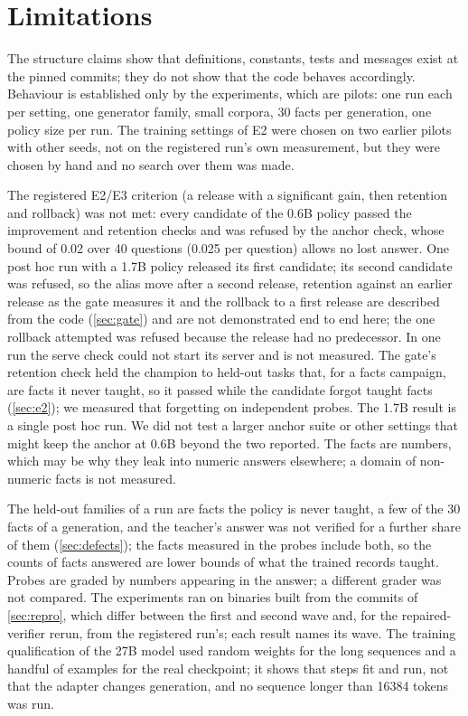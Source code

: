 
\section{Limitations}\label{sec:limitations}

The structure claims show that definitions, constants, tests and messages exist at the pinned
commits; they do not show that the code behaves accordingly. Behaviour is established only by
the experiments, which are pilots: one run each per setting, one generator family, small
corpora, 30 facts per generation, one policy size per run. The training settings of E2 were
chosen on two earlier pilots with other seeds, not on the registered run's own measurement, but
they were chosen by hand and no search over them was made.

The registered E2/E3 criterion (a release with a significant gain, then retention and rollback) was not
met: every candidate of the 0.6B policy passed the improvement and retention checks and was refused by the
anchor check, whose bound of 0.02 over 40 questions (0.025 per question) allows no lost answer. One
post hoc run with a 1.7B policy released its first candidate; its second candidate was refused, so the
alias move after a second release, retention against an earlier release as the gate measures it and the rollback
to a first release are described from the code (\cref{sec:gate}) and are not demonstrated end to end here;
the one rollback attempted was refused because the release had no predecessor. In one run the serve check
could not start its server and is not measured. The gate's retention check held the champion to held-out tasks that,
for a facts campaign, are facts it never taught, so it passed while the candidate forgot taught facts
(\cref{sec:e2}); we measured that forgetting on independent probes. The 1.7B result is a single post hoc run.
We did not test a larger anchor suite or other settings that might keep the anchor at 0.6B beyond the two
reported. The facts are numbers, which may be why they leak into numeric answers elsewhere; a
domain of non-numeric facts is not measured.

The held-out families of a run are facts the policy is never taught, a few of the 30 facts of a
generation, and the teacher's answer was not verified for a further share of them
(\cref{sec:defects}); the facts measured in the probes include both, so the counts of facts answered
are lower bounds of what the trained records taught. Probes are graded by numbers appearing in the
answer; a different grader was not compared. The experiments ran on binaries built from the commits
of \cref{sec:repro}, which differ between the first and second wave and, for the repaired-verifier
rerun, from the registered run's; each result names its wave. The training qualification of the 27B
model used random weights for the long sequences and a handful of examples for the real checkpoint;
it shows that steps fit and run, not that the adapter changes generation, and no sequence longer
than 16384 tokens was run.

